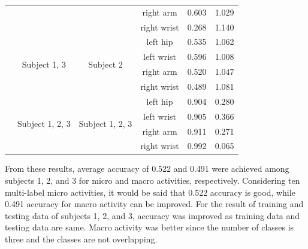 \documentclass{svmult}
\begin{document}
\begin{table}[h]
\begin{tabular}{c|c|c|c|c|c}
         &&&right arm&0.603 &1.029\\
         &&&right wrist&0.268 &1.140\\\cline{2-6}
         & \multirow{4}{*}{Subject 1, 3}& \multirow{4}{*}{Subject 2} & left hip&0.535 &1.062\\
         &&&left wrist&0.596 &1.008\\
         &&&right arm&0.520 &1.047\\
         &&&right wrist&0.489 &1.081\\\cline{2-6}
         & \multirow{4}{*}{Subject 1, 2, 3}& \multirow{4}{*}{Subject 1, 2, 3} & left hip&0.904 &0.280\\
         &&&left wrist&0.905 &0.366\\
         &&&right arm&0.911 &0.271\\
         &&&right wrist&0.992 &0.065\\\hline
    \end{tabular}
\end{table}









From these results, average accuracy of 0.522 and 0.491 were achieved among subjects 1, 2, and 3 for micro and macro activities, respectively. Considering ten multi-label micro activities, it would be said that 0.522 accuracy is good, while 0.491 accuracy for macro activity can be improved. For the result of training and testing data of subjects 1, 2, and 3, accuracy was improved as training data and testing data are same. Macro activity was better since the number of classes is three and the classes are not overlapping.
\end{document}
